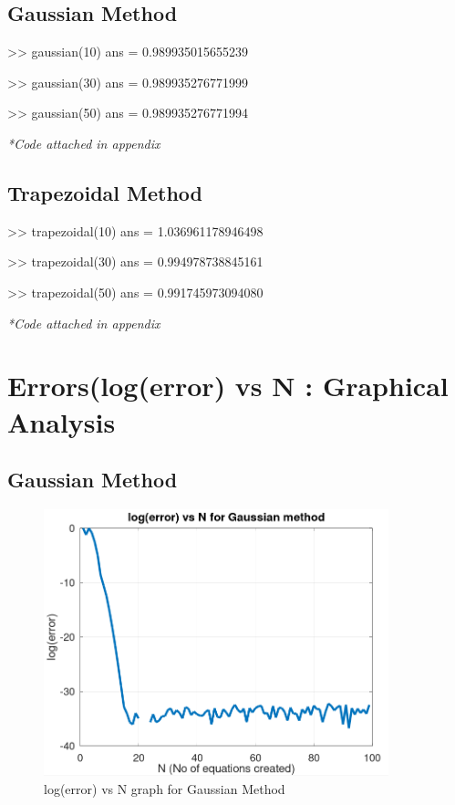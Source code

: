 \documentclass[12pt]{article}
\begin{document}
\subsection{Gaussian Method}
\begin{python}
>> gaussian(10)
ans = 0.989935015655239

>> gaussian(30)
ans = 0.989935276771999

>> gaussian(50)
ans = 0.989935276771994

\end{python}
\textit{*Code attached in appendix}

\subsection{Trapezoidal Method}
\begin{python}
>> trapezoidal(10)
ans = 1.036961178946498

>> trapezoidal(30)
ans = 0.994978738845161

>> trapezoidal(50)
ans = 0.991745973094080

\end{python}
\textit{*Code attached in appendix}

\section{Errors(log(error) vs N : Graphical Analysis}
\subsection{Gaussian Method}
\begin{figure}[H]
    \centering
    \includegraphics[width=10cm]{errg.png}
    \caption{log(error) vs N graph for Gaussian Method}
\end{figure}
\end{document}
